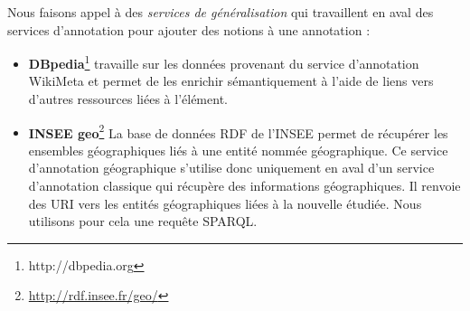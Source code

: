 \documentclass[]{easychair}
\newcommand{\comment}[4]{\par\noindent\hspace*{-0.5cm}{\parbox{\columnwidth}{\textbf{\color{#1}//#2[#3]:#4}}}\par}
\newcommand{\mi}[1]{\comment{blue}{}{#1}{MI}}
\newcommand{\ch}[1]{\comment{green}{}{#1}{CH}}
\begin{document}
Nous faisons appel à des \textit{services de généralisation} qui travaillent en aval des services d'annotation pour ajouter des notions à une annotation :
\begin{itemize}
	\item \textbf{DBpedia}\footnote{http://dbpedia.org} travaille sur les données provenant du service d'annotation WikiMeta et permet de les enrichir sémantiquement à l'aide de liens vers d'autres ressources liées à l'élément.
  \item \textbf{INSEE geo}\footnote{\url{http://rdf.insee.fr/geo/}} La base de données RDF de l'INSEE permet de récupérer les ensembles géographiques liés à une entité nommée géographique. Ce service d'annotation géographique s'utilise donc uniquement en aval d'un service d'annotation classique qui récupère des informations géographiques. Il renvoie des URI vers les entités géographiques liées à la nouvelle étudiée. Nous utilisons pour cela une requête SPARQL.
\end{itemize}


\end{document}
